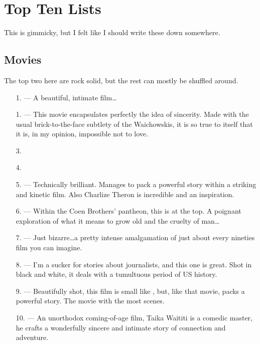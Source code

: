 \documentclass[../butidigress.tex]{subfiles}
\begin{document}
\chapter{Top Ten Lists}
\newpage

This is gimmicky, but I felt like I should write these down somewhere.
\section{Movies}\label{sec:moviestopten}
The top two here are rock solid, but the rest can mostly be shuffled around.

\begin{itemize}
    \item[1.] \textbf{} --- A beautiful, intimate film\ldots{}
    \item[1.] \textbf{} --- This movie encapsulates perfectly the idea of sincerity. Made with the usual brick-to-the-face subtlety of the Waichowskis, it is so true to itself that it is, in my opinion, impossible not to love.
    \item[3.]
    \item[4.]
    \item[5.] \textbf{} --- Technically brilliant. Manages to pack a powerful story within a striking and kinetic film. Also Charlize Theron is incredible and an inspiration.
    \item[6.] \textbf{} --- Within the Coen Brothers' pantheon, this is at the top. A poignant exploration of what it means to grow old and the cruelty of man\ldots
    \item[7.] \textbf{} --- Just bizarre\ldots a pretty intense amalgamation of just about every nineties film you can imagine.
    \item[8.] \textbf{} --- I'm a sucker for stories about journalists, and this one is great. Shot in black and white, it deals with a tumultuous period of US history.
    \item[9.] \textbf{} --- Beautifully shot, this film is small like , but, like that movie, packs a powerful story. The movie with the most  scenes.
    \item[10.] \textbf{} --- An unorthodox coming-of-age film, Taika Waititi is a comedic master, he crafts a wonderfully sincere and intimate story of connection and adventure.
\end{itemize}
\end{document}

